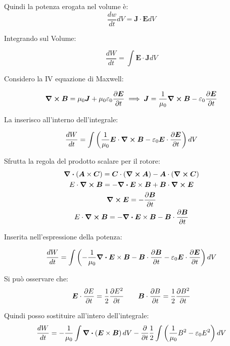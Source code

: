 \documentclass[a4paper]{scrarticle}
\begin{document}
Quindi la potenza erogata nel volume è:
\begin{equation}
    \frac{dw}{dt}dV = \bm J \cdot \bm E dV
\end{equation}

Integrando sul Volume:

\begin{equation*}
    \frac{dW}{dt}= \int \bm E \cdot \bm J dV
\end{equation*}

Considero la IV equazione di Maxwell:

\begin{equation*}
    \curl {\bm B} = \mu_0 \bm J + \mu_0\varepsilon_0 \pdv{\bm E}{t} \implies \bm J = \frac{1}{\mu_0} \curl {\bm B} - \varepsilon_0 \pdv{\bm E}{t}
\end{equation*}

La inserisco all'interno dell'integrale:

\begin{equation*}
    \frac{dW}{dt} = \int \left(\frac{1}{\mu_0} \bm E \cdot \curl{\bm B} - \varepsilon_0 \bm E \cdot \pdv{\bm E}{t} \right) dV
\end{equation*}

Sfrutta la regola del prodotto scalare per il rotore:
\begin{gather*}
    \div (\bm A \times \bm C) = \bm C \cdot (\curl{\bm A}) - \bm A \cdot (\curl{\bm C})\\
    E \cdot \curl{\bm B} = - \div{\bm E \times \bm B} + \bm B \cdot \curl{\bm E}\\
    \curl{\bm E} = - \pdv{\bm B}{t}\\
    E \cdot \curl{\bm B} = - \div{\bm E \times \bm B} - \bm B \cdot \pdv{\bm B}{t}
\end{gather*}

Inserita nell'espressione della potenza:

\begin{equation*}
    \frac{dW}{dt} = \int \left(- \frac{1}{\mu_0}\div{\bm E \times \bm B} - \bm B \cdot \pdv{\bm B}{t} - \varepsilon_0 \bm E \cdot \pdv{\bm E}{t}\right)dV
\end{equation*}

Si può osservare che:
\begin{equation*}
    \bm E \cdot \pdv{E}{t} = \frac{1}{2} \pdv{E^2}{t} \qquad
    \bm B \cdot \pdv{B}{t} = \frac{1}{2} \pdv{B^2}{t}
\end{equation*}

Quindi posso sostituire all'intero dell'integrale:
\begin{equation*}
    \frac{dW}{dt} = -\frac{1}{\mu_0}\int \div{\left(\bm E \times \bm B\right)} dV - \pdv{t}\frac{1}{2}\int\left(\frac{1}{\mu_0}B^2- \varepsilon_0 {E^2}\right) dV
\end{equation*}
\end{document}
